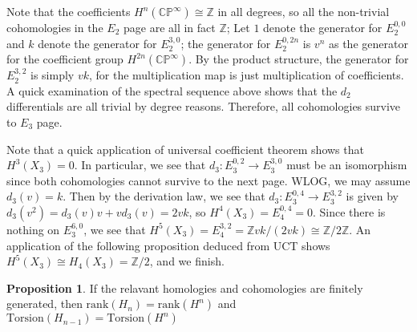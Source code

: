 \documentclass{article}
\theoremstyle{definition}
\theoremstyle{definition}
\newtheorem{proposition}{Proposition}[theorem]
\theoremstyle{definition}
\theoremstyle{definition}
\theoremstyle{definition}
\theoremstyle{definition}
\begin{document}
Note that the coefficients $H^n(\mathbb{CP}^{\infty})\cong \mathbb{Z}$ in all degrees, so all the non-trivial cohomologies in the $E_2$ page are all in fact $\mathbb{Z}$; Let $1$ denote the generator for $E_2^{0,0}$ and $k$ denote the generator for $E_2^{3,0}$; the generator for $E_2^{0,2n}$ is $v^n$ as the generator for the coefficient group $H^{2n}(\mathbb{CP}^{\infty})$. By the product structure, the generator for $E_2^{3,2}$ is simply $vk$, for the multiplication map is just multiplication of coefficients.
A quick examination of the spectral sequence above shows that the $d_2$ differentials are all trivial by degree reasons. Therefore, all cohomologies survive to $E_3$ page.

Note that a quick application of universal coefficient theorem shows that $H^3(X_3)=0$. In particular, we see that $d_3: E_3^{0,2}\to E_3^{3,0}$ must be an isomorphism since both cohomologies cannot survive to the next page. WLOG, we may assume $d_3(v)=k$. Then by the derivation law, we see that $d_3: E_3^{0,4}\to E_3^{3,2}$ is given by $d_3(v^2)=d_3(v)v+vd_3(v)=2vk$, so $H^4(X_3)=E_4^{0,4}=0$. Since there is nothing on $E_3^{6,0}$, we see that $H^5(X_3)=E_4^{3,2}=\mathbb{Z}vk/(2vk)\cong \mathbb{Z}/2 \mathbb{Z}$. An application of the following proposition deduced from UCT shows $H^5(X_3)\cong H_4(X_3)=\mathbb{Z}/2$, and we finish.
	

\begin{tcolorbox}[colback=blue!5!white,colframe=blue!30!white]
\begin{proposition}
	If the relavant homologies and cohomologies are finitely generated, then $\textrm{rank}(H_n)=\textrm{rank}(H^n)$ and $\textrm{Torsion}(H_{n-1})=\textrm{Torsion}(H^n)$
\end{proposition}
\end{tcolorbox}
	
\end{document}
